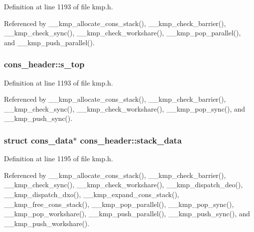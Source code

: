 Definition at line 1193 of file kmp.\-h.



Referenced by \-\_\-\-\_\-kmp\-\_\-allocate\-\_\-cons\-\_\-stack(), \-\_\-\-\_\-kmp\-\_\-check\-\_\-barrier(), \-\_\-\-\_\-kmp\-\_\-check\-\_\-sync(), \-\_\-\-\_\-kmp\-\_\-check\-\_\-workshare(), \-\_\-\-\_\-kmp\-\_\-pop\-\_\-parallel(), and \-\_\-\-\_\-kmp\-\_\-push\-\_\-parallel().

\hypertarget{structcons__header_acaf8577c3c1f0a0b0aa18b29ce426b30}{
\subsubsection[{s\-\_\-top}]{ cons\-\_\-header\-::s\-\_\-top}}\label{structcons__header_acaf8577c3c1f0a0b0aa18b29ce426b30}


Definition at line 1193 of file kmp.\-h.



Referenced by \-\_\-\-\_\-kmp\-\_\-allocate\-\_\-cons\-\_\-stack(), \-\_\-\-\_\-kmp\-\_\-check\-\_\-barrier(), \-\_\-\-\_\-kmp\-\_\-check\-\_\-sync(), \-\_\-\-\_\-kmp\-\_\-check\-\_\-workshare(), \-\_\-\-\_\-kmp\-\_\-pop\-\_\-sync(), and \-\_\-\-\_\-kmp\-\_\-push\-\_\-sync().

\hypertarget{structcons__header_ad85d65edead496f21419376e08bc6e20}{
\subsubsection[{stack\-\_\-data}]{\setlength{\rightskip}{0pt plus 5cm}struct {\bf cons\-\_\-data}$\ast$ cons\-\_\-header\-::stack\-\_\-data}}\label{structcons__header_ad85d65edead496f21419376e08bc6e20}


Definition at line 1195 of file kmp.\-h.



Referenced by \-\_\-\-\_\-kmp\-\_\-allocate\-\_\-cons\-\_\-stack(), \-\_\-\-\_\-kmp\-\_\-check\-\_\-barrier(), \-\_\-\-\_\-kmp\-\_\-check\-\_\-sync(), \-\_\-\-\_\-kmp\-\_\-check\-\_\-workshare(), \-\_\-\-\_\-kmp\-\_\-dispatch\-\_\-deo(), \-\_\-\-\_\-kmp\-\_\-dispatch\-\_\-dxo(), \-\_\-\-\_\-kmp\-\_\-expand\-\_\-cons\-\_\-stack(), \-\_\-\-\_\-kmp\-\_\-free\-\_\-cons\-\_\-stack(), \-\_\-\-\_\-kmp\-\_\-pop\-\_\-parallel(), \-\_\-\-\_\-kmp\-\_\-pop\-\_\-sync(), \-\_\-\-\_\-kmp\-\_\-pop\-\_\-workshare(), \-\_\-\-\_\-kmp\-\_\-push\-\_\-parallel(), \-\_\-\-\_\-kmp\-\_\-push\-\_\-sync(), and \-\_\-\-\_\-kmp\-\_\-push\-\_\-workshare().

